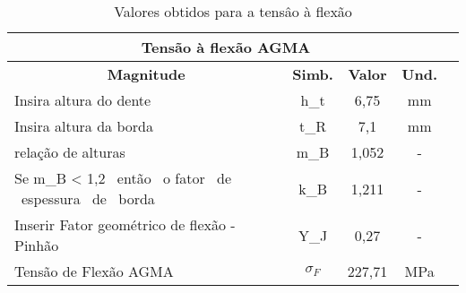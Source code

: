 \begin{table}
\centering
\caption{\label{tab:5} Valores obtidos para a tensâo à flexão}
\begin{tabular}{l c c c c}
\hline
\multicolumn{4}{c}{\textbf{Tensão à flexão AGMA}}                                                  \\ \hline
\multicolumn{1}{c}{\textbf{Magnitude}}           & \textbf{Simb.} & \textbf{Valor} & \textbf{Und.} \\ \hline
Insira altura do dente                           & h_t             & 6,75           & mm            \\
Insira altura da borda                           & t_R             & 7,1            & mm            \\
relação de alturas                               & m_B             & 1,052          & -             \\
Se m_B < 1,2 \ então \ o fator \ de \ espessura \ de \ borda & k_B             & 1,211          & -             \\
Inserir Fator geométrico de flexão - Pinhão      & Y_J             & 0,27           & -             \\
Tensão de Flexão AGMA                            & $\sigma_F$       & 227,71         & MPa     \\ \hline     
\end{tabular}
\end{table}